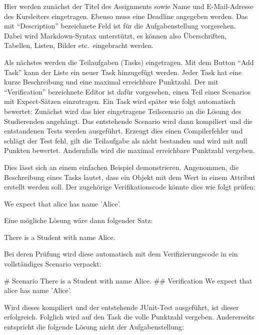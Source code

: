 Hier werden zunächst der Titel des Assignments sowie Name und E-Mail-Adresse des Kursleiters eingetragen.
Ebenso muss eine Deadline angegeben werden.
Das mit ``Description'' bezeichnete Feld ist für die Aufgabenstellung vorgesehen.
Dabei wird Markdown-Syntax unterstützt, es können also Überschriften, Tabellen, Listen, Bilder etc.\ eingebracht werden.

Als nächstes werden die Teilaufgaben (Tasks) eingetragen.
Mit dem Button ``Add Task'' kann der Liste ein neuer Task hinzugefügt werden.
Jeder Task hat eine kurze Beschreibung und eine maximal erreichbare Punktzahl.
Der mit ``Verification'' bezeichnete Editor ist dafür vorgesehen, einen Teil eines Scenarios mit Expect-Sätzen einzutragen.
Ein Task wird später wie folgt automatisch bewertet:
Zunächst wird das hier eingetragene Teilscenario an die Lösung des Studierenden angehängt.
Das entstehende Scenario wird dann kompiliert und die entstandenen Tests werden ausgeführt.
Erzeugt dies einen Compilerfehler und schlägt der Test fehl, gilt die Teilaufgabe als nicht bestanden und wird mit null Punkten bewertet.
Andernfalls wird die maximal erreichbare Punktzahl vergeben.

Dies lässt sich an einem einfachen Beispiel demonstrieren.
Angenommen, die Beschreibung eines Tasks lautet, dass ein Objekt  mit dem Wert  in einem Attribut  erstellt werden soll.
Der zugehörige Verifikationscode könnte dies wie folgt prüfen:

\begin{mdcodeblock}
    We expect that alice has name 'Alice'.
\end{mdcodeblock}

Eine mögliche Lösung wäre dann folgender Satz:

\begin{mdcodeblock}
    There is a Student with name Alice.
\end{mdcodeblock}

Bei deren Prüfung wird diese automatisch mit dem Verifizierungscode in ein vollständiges Scenario verpackt:

\begin{mdcodeblock}
    # Scenario
    There is a Student with name Alice.
    ## Verification
    We expect that alice has name 'Alice'.
\end{mdcodeblock}

Wird dieses kompiliert und der entstehende JUnit-Test ausgeführt, ist dieser erfolgreich.
Folglich wird auf den Task die volle Punktzahl vergeben.
Andererseits entspricht die folgende Lösung nicht der Aufgabenstellung:

